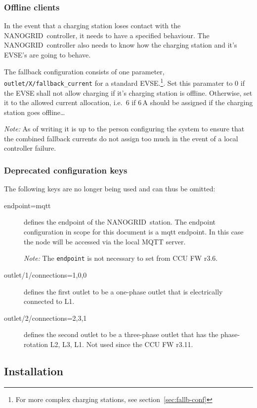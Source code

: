 \documentclass[10pt,a4paper,oneside,headings=big,headsepline]{scrreprt}
\newcommand{\nanogrid}{NANOGRID\texttrademark}
\begin{document}
\subsubsection{Offline clients}
\label{sec:offline-clients}

In the event that a charging station loses contact with the \nanogrid\
controller, it needs to have a specified behaviour. The \nanogrid\ controller
also needs to know how the charging station and it's EVSE's are going to
behave.

The fallback configuration consists of one parameter,
\verb|outlet/X/fallback_current| for a standard EVSE.\footnote{For more complex
charging stations, see section~\ref{sec:fallb-conf}}. Set this paramater to 0
if the EVSE shall not allow charging if it's charging station is
offline. Otherwise, set it to the allowed current allocation, i.e.\ 6 if 6\,A
should be assigned if the charging station goes offline\ldots

\emph{Note:} As of writing it is up to the person configuring the system to
ensure that the combined fallback currents do not assign too much in the event
of a local controller failure.


\subsubsection{Deprecated configuration keys}
\label{sec:depr-conf-keys}

The following keys are no longer being used and can thus be omitted:
\begin{description}

\item [endpoint=mqtt] defines the endpoint of the \nanogrid\ station. The
  endpoint configuration in scope for this document is a mqtt endpoint. In
  this case the node will be accessed via the local MQTT server.

  \emph{Note:} The \verb|endpoint| is not necessary to set from CCU FW r3.6.

\item [outlet/1/connections=1,0,0] defines the first outlet to be a one-phase
  outlet that is electrically connected to L1.

\item [outlet/2/connections=2,3,1] defines the second outlet to be a
  three-phase outlet that has the phase-rotation L2, L3, L1.  Not used since
  the CCU FW r3.11.
\end{description}


\subsection{Installation}
\end{document}
